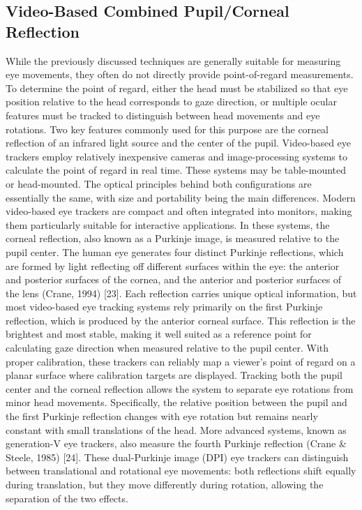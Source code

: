 \documentclass[12pt]{report}
\begin{document}
\subsection{Video-Based Combined Pupil/Corneal Reflection}

While the previously discussed techniques are generally suitable for measuring eye movements, they often do not directly provide point-of-regard measurements.
To determine the point of regard, either the head must be stabilized so that eye position relative to the head corresponds to gaze direction, or multiple ocular features must be tracked to distinguish between head movements and eye rotations.
Two key features commonly used for this purpose are the corneal reflection of an infrared light source and the center of the pupil.
Video-based eye trackers employ relatively inexpensive cameras and image-processing systems to calculate the point of regard in real time. 
These systems may be table-mounted or head-mounted.
The optical principles behind both configurations are essentially the same, with size and portability being the main differences.
Modern video-based eye trackers are compact and often integrated into monitors, making them particularly suitable for interactive applications.
In these systems, the corneal reflection, also known as a Purkinje image, is measured relative to the pupil center.
The human eye generates four distinct Purkinje reflections, which are formed by light reflecting off different surfaces within the eye: the anterior and posterior surfaces of the cornea, and the anterior and posterior surfaces of the lens (Crane, 1994) [23].
Each reflection carries unique optical information, but most video-based eye tracking systems rely primarily on the first Purkinje reflection, which is produced by the anterior corneal surface. 
This reflection is the brightest and most stable, making it well suited as a reference point for calculating gaze direction when measured relative to the pupil center.
With proper calibration, these trackers can reliably map a viewer's point of regard on a planar surface where calibration targets are displayed. 
Tracking both the pupil center and the corneal reflection allows the system to separate eye rotations from minor head movements.
Specifically, the relative position between the pupil and the first Purkinje reflection changes with eye rotation but remains nearly constant with small translations of the head.
More advanced systems, known as generation-V eye trackers, also measure the fourth Purkinje reflection (Crane \& Steele, 1985) [24].
These dual-Purkinje image (DPI) eye trackers can distinguish between translational and rotational eye movements: both reflections shift equally during translation, but they move differently during rotation, allowing the separation of the two effects.
\end{document}
